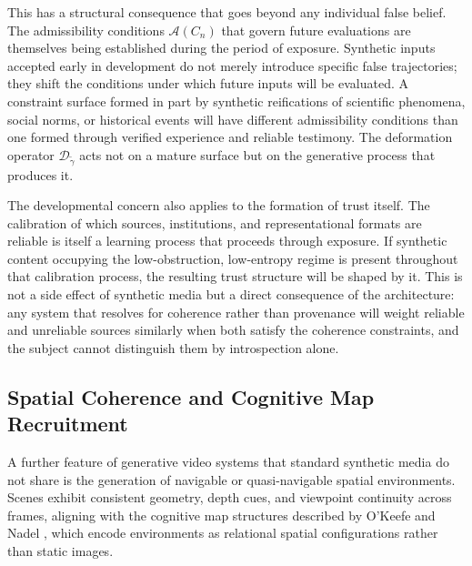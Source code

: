 \documentclass[12pt, a4paper]{article}
\begin{document}
This has a structural consequence that goes beyond any individual false belief. The admissibility conditions $\mathcal{A}(C_n)$ that govern future evaluations are themselves being established during the period of exposure. Synthetic inputs accepted early in development do not merely introduce specific false trajectories; they shift the conditions under which future inputs will be evaluated. A constraint surface formed in part by synthetic reifications of scientific phenomena, social norms, or historical events will have different admissibility conditions than one formed through verified experience and reliable testimony. The deformation operator $\mathcal{D}_{\tilde{\gamma}}$ acts not on a mature surface but on the generative process that produces it.

The developmental concern also applies to the formation of trust itself. The calibration of which sources, institutions, and representational formats are reliable is itself a learning process that proceeds through exposure. If synthetic content occupying the low-obstruction, low-entropy regime is present throughout that calibration process, the resulting trust structure will be shaped by it. This is not a side effect of synthetic media but a direct consequence of the architecture: any system that resolves for coherence rather than provenance will weight reliable and unreliable sources similarly when both satisfy the coherence constraints, and the subject cannot distinguish them by introspection alone.

\subsection{Spatial Coherence and Cognitive Map Recruitment}

A further feature of generative video systems that standard synthetic media do not share is the generation of navigable or quasi-navigable spatial environments. Scenes exhibit consistent geometry, depth cues, and viewpoint continuity across frames, aligning with the cognitive map structures described by O'Keefe and Nadel \cite{okeefe1978}, which encode environments as relational spatial configurations rather than static images.
\end{document}
